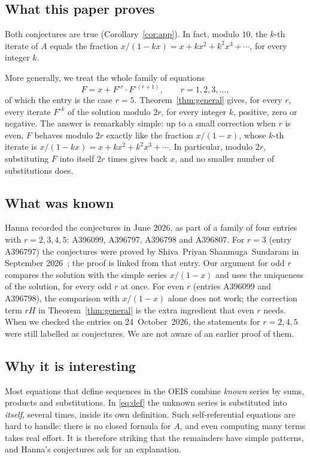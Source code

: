 \documentclass[11pt,a4paper]{article}
\theoremstyle{definition}
\theoremstyle{remark}
\begin{document}
\subsection{What this paper proves}
Both conjectures are true (Corollary~\ref{cor:app}). In fact, modulo $10$, the $k$-th iterate of $A$
equals the fraction $x/(1-kx)=x+kx^2+k^2x^3+\cdots$, for every integer $k$.

More generally, we treat the whole family of equations
\[
F=x+F^{\circ r}\cdot F^{\circ(r+1)},\qquad r=1,2,3,\dots,
\]
of which the entry is the case $r=5$. Theorem~\ref{thm:general} gives, for every $r$, every
iterate $F^{\circ k}$ of the solution modulo $2r$, for every integer $k$, positive, zero or negative. The answer is
remarkably simple: up to a small correction when $r$ is even, $F$ behaves modulo $2r$ exactly like the fraction
$x/(1-x)$, whose $k$-th iterate is $x/(1-kx)=x+kx^2+k^2x^3+\cdots$. In particular, modulo $2r$, substituting $F$ into
itself $2r$ times gives back $x$, and no smaller number of substitutions does.

\subsection{What was known}
Hanna recorded the conjectures in June 2026, as part of a family of four entries with $r=2,3,4,5$:
A396099, A396797, A396798 and A396807. For $r=3$ (entry A396797) the conjectures were proved by Shiva~Priyan
Shanmuga~Sundaram in September 2026~\cite{sundaram}; the proof is linked from that entry. Our argument for odd $r$ compares
the solution with the simple series $x/(1-x)$ and uses the uniqueness of the solution, for every odd $r$ at
once. For even $r$ (entries A396099 and A396798), the comparison with $x/(1-x)$ alone does not work; the correction term $rH$ in
Theorem~\ref{thm:general} is the extra ingredient that even $r$ needs. When we checked the entries on
24~October~2026, the statements for $r=2,4,5$ were still labelled as conjectures. We are not aware of an earlier proof
of them.

\subsection{Why it is interesting}
Most equations that define sequences in the OEIS combine \emph{known} series by sums, products and substitutions.
In \eqref{eq:def} the unknown series is substituted into \emph{itself}, several times, inside its own definition.
Such self-referential equations are hard to handle: there is no closed formula for $A$, and even computing many terms
takes real effort. It is therefore striking that the remainders have simple patterns, and Hanna's conjectures ask
for an explanation.
\end{document}
